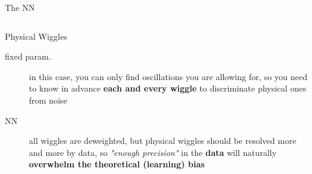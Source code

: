 \documentclass[9pt]{beamer}
\begin{document}
\begin{frame}{The NN}
\begin{columns}
\begin{column}{0.5\textwidth}
\begin{exampleblock}{Physical Wiggles}
                \begin{description}
                    \item[fixed param.] in this case, you can only find
                        oscillations you are allowing for, so you need to know
                        in advance \textbf{each and every wiggle} to
                        discriminate physical ones from noise
                    \item[NN] all wiggles are deweighted, but physical wiggles
                        should be resolved more and more by data, so
                        \textit{"enough precision"} in the
                        \alert{\textbf{data}} will naturally
                        \textbf{\alert{overwhelm} the theoretical
                        \alert{(learning) bias}}
                \end{description}
            \end{exampleblock}
        \end{column}
    \end{columns}
\end{frame}
\end{document}
